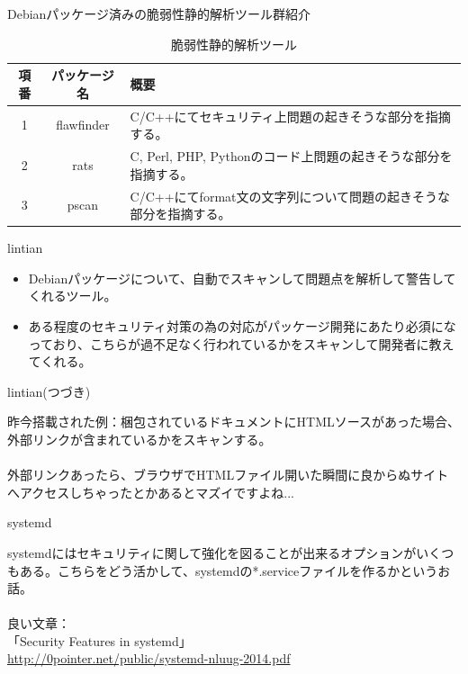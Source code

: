 \begin{frame}{Debianパッケージ済みの脆弱性静的解析ツール群紹介}
\begin{table}
\begin{center}
\begin{tabular}{|c|c|p{5cm}|}
\hline
項番 & パッケージ名 & 概要 \\ \hline \hline
1 & flawfinder & C/C++にてセキュリティ上問題の起きそうな部分を指摘する。 \\ \hline
2 & rats & C, Perl, PHP, Pythonのコード上問題の起きそうな部分を指摘する。\\ \hline
3 & pscan & C/C++にてformat文の文字列について問題の起きそうな部分を指摘する。 \\ \hline
\end{tabular}
\end{center}
\caption{脆弱性静的解析ツール}
\end{table}

\end{frame}

\begin{frame}{lintian}

\begin{itemize}
\item  Debianパッケージについて、自動でスキャンして問題点を解析して警告してくれるツール。
\item ある程度のセキュリティ対策の為の対応がパッケージ開発にあたり必須になっており、こちらが過不足なく行われているかをスキャンして開発者に教えてくれる。
\end{itemize}

\end{frame}

\begin{frame}{lintian(つづき)}

 昨今搭載された例：梱包されているドキュメントにHTMLソースがあった場合、外部リンクが含まれているかをスキャンする。\\
\ \\
 外部リンクあったら、ブラウザでHTMLファイル開いた瞬間に良からぬサイトへアクセスしちゃったとかあるとマズイですよね...
\end{frame}

\begin{frame}{systemd}

  systemdにはセキュリティに関して強化を図ることが出来るオプションがいくつもある。こちらをどう活かして、systemdの*.serviceファイルを作るかというお話。\\
\ \\
良い文章：\\
「Security Features in systemd」\\
\url{http://0pointer.net/public/systemd-nluug-2014.pdf}

\end{frame}

